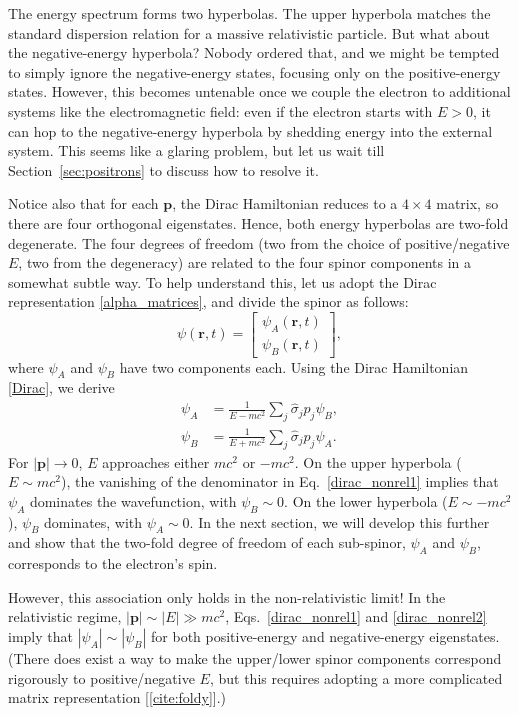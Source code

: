 \documentclass[prx,12pt]{revtex4-2}
\begin{document}
The energy spectrum forms two hyperbolas.  The upper hyperbola matches
the standard dispersion relation for a massive relativistic particle.
But what about the negative-energy hyperbola?  Nobody ordered that,
and we might be tempted to simply ignore the negative-energy states,
focusing only on the positive-energy states.  However, this becomes
untenable once we couple the electron to additional systems like the
electromagnetic field: even if the electron starts with $E > 0$, it
can hop to the negative-energy hyperbola by shedding energy into the
external system.  This seems like a glaring problem, but let us wait
till Section~\ref{sec:positrons} to discuss how to resolve it.

Notice also that for each $\mathbf{p}$, the Dirac Hamiltonian reduces
to a $4\times4$ matrix, so there are four orthogonal eigenstates.
Hence, both energy hyperbolas are two-fold degenerate.  The four
degrees of freedom (two from the choice of positive/negative $E$, two
from the degeneracy) are related to the four spinor components in a
somewhat subtle way.  To help understand this, let us adopt the Dirac
representation \eqref{alpha_matrices}, and divide the spinor as
follows:
\begin{equation}
  \psi(\mathbf{r},t) = \begin{bmatrix}\psi_A(\mathbf{r},t)
    \\ \psi_B(\mathbf{r},t)
  \end{bmatrix},
  \label{diracdivision}
\end{equation}
where $\psi_A$ and $\psi_B$ have two components each.  Using the Dirac
Hamiltonian \eqref{Dirac}, we derive
\begin{align}
  \psi_A &= \frac{1}{E - mc^2} \sum_j \hat{\sigma}_j p_j \psi_B,
  \label{dirac_nonrel1} \\
  \psi_B &= \frac{1}{E + mc^2} \sum_j \hat{\sigma}_j p_j \psi_A.
  \label{dirac_nonrel2}
\end{align}
For $|\mathbf{p}| \rightarrow 0$, $E$ approaches either $mc^2$ or
$-mc^2$.  On the upper hyperbola ($E \sim mc^2$), the vanishing of the
denominator in Eq.~\eqref{dirac_nonrel1} implies that $\psi_A$
dominates the wavefunction, with $\psi_B \sim 0$.  On the lower
hyperbola ($E \sim -mc^2$), $\psi_B$ dominates, with $\psi_A \sim 0$.
In the next section, we will develop this further and show that the
two-fold degree of freedom of each sub-spinor, $\psi_A$ and $\psi_B$,
corresponds to the electron's spin.

However, this association only holds in the non-relativistic limit!
In the relativistic regime, $|\mathbf{p}| \sim |E| \gg mc^2$,
Eqs.~\eqref{dirac_nonrel1} and \eqref{dirac_nonrel2} imply that
$|\psi_A| \sim |\psi_B|$ for both positive-energy and negative-energy
eigenstates.  (There does exist a way to make the upper/lower spinor
components correspond rigorously to positive/negative $E$, but this
requires adopting a more complicated matrix representation
[\ref{cite:foldy}].)
\end{document}
